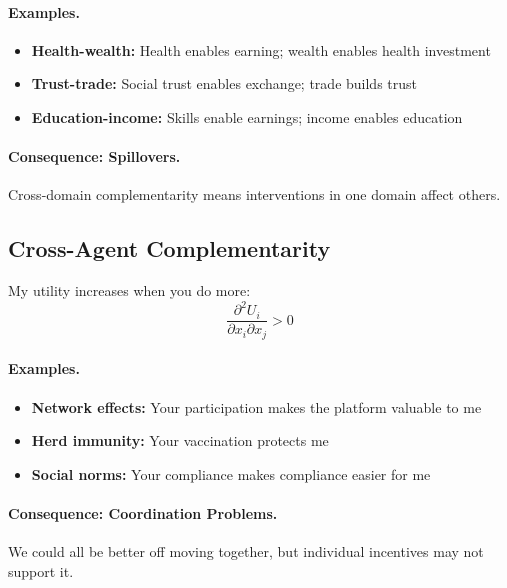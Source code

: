 \paragraph{Examples.}
\begin{itemize}[nosep]
  \item \textbf{Health-wealth:} Health enables earning; wealth enables health investment
  \item \textbf{Trust-trade:} Social trust enables exchange; trade builds trust
  \item \textbf{Education-income:} Skills enable earnings; income enables education
\end{itemize}

\paragraph{Consequence: Spillovers.}
Cross-domain complementarity means interventions in one domain affect others.

\subsection{Cross-Agent Complementarity}

\begin{definition}
My utility increases when you do more:
\begin{equation}
  \frac{\partial^2 U_i}{\partial x_i \partial x_j} > 0
\end{equation}
\end{definition}

\paragraph{Examples.}
\begin{itemize}[nosep]
  \item \textbf{Network effects:} Your participation makes the platform valuable to me
  \item \textbf{Herd immunity:} Your vaccination protects me
  \item \textbf{Social norms:} Your compliance makes compliance easier for me
\end{itemize}

\paragraph{Consequence: Coordination Problems.}
We could all be better off moving together, but individual incentives may not support it.


